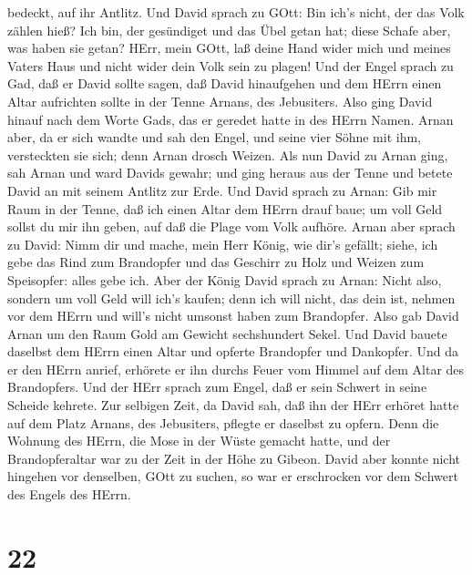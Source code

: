 bedeckt, auf ihr Antlitz.  Und David sprach zu GOtt: Bin
ich's nicht, der das Volk zählen hieß? Ich bin, der gesündiget und das
Übel getan hat; diese Schafe aber, was haben sie getan? HErr, mein GOtt,
laß deine Hand wider mich und meines Vaters Haus und nicht wider dein
Volk sein zu plagen!  Und der Engel sprach zu Gad, daß er
David sollte sagen, daß David hinaufgehen und dem HErrn einen Altar
aufrichten sollte in der Tenne Arnans, des Jebusiters. 
Also ging David hinauf nach dem Worte Gads, das er geredet hatte in des
HErrn Namen.  Arnan aber, da er sich wandte und sah den
Engel, und seine vier Söhne mit ihm, versteckten sie sich; denn Arnan
drosch Weizen.  Als nun David zu Arnan ging, sah Arnan und
ward Davids gewahr; und ging heraus aus der Tenne und betete David an
mit seinem Antlitz zur Erde.  Und David sprach zu Arnan:
Gib mir Raum in der Tenne, daß ich einen Altar dem HErrn drauf baue; um
voll Geld sollst du mir ihn geben, auf daß die Plage vom Volk aufhöre.
 Arnan aber sprach zu David: Nimm dir und mache, mein Herr
König, wie dir's gefällt; siehe, ich gebe das Rind zum Brandopfer und
das Geschirr zu Holz und Weizen zum Speisopfer: alles gebe ich.
 Aber der König David sprach zu Arnan: Nicht also, sondern
um voll Geld will ich's kaufen; denn ich will nicht, das dein ist,
nehmen vor dem HErrn und will's nicht umsonst haben zum Brandopfer.
 Also gab David Arnan um den Raum Gold am Gewicht
sechshundert Sekel.  Und David bauete daselbst dem HErrn
einen Altar und opferte Brandopfer und Dankopfer. Und da er den HErrn
anrief, erhörete er ihn durchs Feuer vom Himmel auf dem Altar des
Brandopfers.  Und der HErr sprach zum Engel, daß er sein
Schwert in seine Scheide kehrete.  Zur selbigen Zeit, da
David sah, daß ihn der HErr erhöret hatte auf dem Platz Arnans, des
Jebusiters, pflegte er daselbst zu opfern.  Denn die
Wohnung des HErrn, die Mose in der Wüste gemacht hatte, und der
Brandopferaltar war zu der Zeit in der Höhe zu Gibeon. 
David aber konnte nicht hingehen vor denselben, GOtt zu suchen, so war
er erschrocken vor dem Schwert des Engels des HErrn.

\hypertarget{section-21}{%
\section{22}\label{section-21}}

